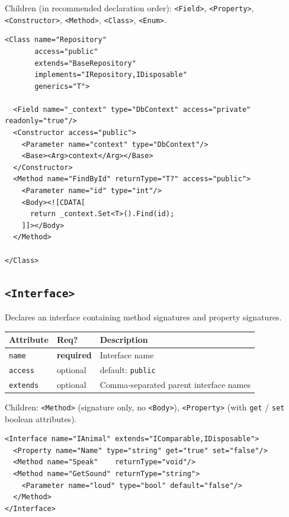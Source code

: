 \documentclass[11pt,a4paper]{article}
\newcommand{\el}[1]{\texttt{\textcolor{xoop-keyword}{<#1>}}}
\newcommand{\attr}[1]{\texttt{\textcolor{xoop-attr}{#1}}}
\newcommand{\required}{\textcolor{xoop-red}{\textbf{required}}}
\newcommand{\optional}{\textcolor{xoop-green}{optional}}
\newcommand{\default}[1]{\textcolor{xoop-green}{default: \texttt{#1}}}
\begin{document}
Children (in recommended declaration order):
\el{Field}, \el{Property}, \el{Constructor}, \el{Method}, \el{Class}, \el{Enum}.

\begin{lstlisting}[caption={Class with inheritance, interface, and generics}]
<Class name="Repository"
       access="public"
       extends="BaseRepository"
       implements="IRepository,IDisposable"
       generics="T">

  <Field name="_context" type="DbContext" access="private" readonly="true"/>
  <Constructor access="public">
    <Parameter name="context" type="DbContext"/>
    <Base><Arg>context</Arg></Base>
  </Constructor>
  <Method name="FindById" returnType="T?" access="public">
    <Parameter name="id" type="int"/>
    <Body><![CDATA[
      return _context.Set<T>().Find(id);
    ]]></Body>
  </Method>

</Class>
\end{lstlisting}

\subsection{\el{Interface}}

Declares an interface containing method signatures and property signatures.

\begin{center}
\begin{tabularx}{\linewidth}{llX}
\toprule
Attribute & Req? & Description \\
\midrule
\attr{name}    & \required & Interface name \\
\attr{access}  & \optional & \default{public} \\
\attr{extends} & \optional & Comma-separated parent interface names \\
\bottomrule
\end{tabularx}
\end{center}

Children: \el{Method} (signature only, no \el{Body}), \el{Property}
(with \attr{get} / \attr{set} boolean attributes).

\begin{lstlisting}[caption={Interface declaration}]
<Interface name="IAnimal" extends="IComparable,IDisposable">
  <Property name="Name" type="string" get="true" set="false"/>
  <Method name="Speak"    returnType="void"/>
  <Method name="GetSound" returnType="string">
    <Parameter name="loud" type="bool" default="false"/>
  </Method>
</Interface>
\end{lstlisting}
\end{document}
